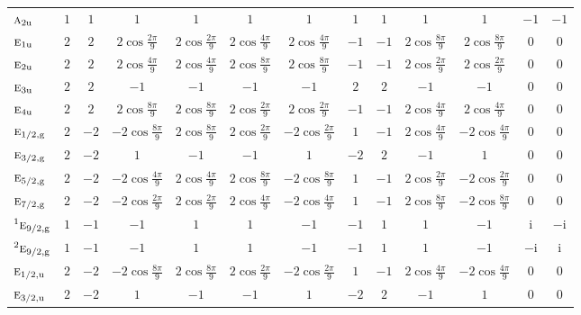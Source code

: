 \documentclass[10pt,a4paper]{article}
\makeatletter
\def\grouprule#1#2{\noalign{\marks\LTgroupmarks{\the\belowrulesep}\nobreak\vskip#1%
  \vskip\aboverulesep}\multispan\LT@cols\unskip{\leaders\hrule\@height#2\hfill\kern\z@}\cr
  \noalign{\penalty\LTrulebreak\vskip\belowrulesep\global\@lastruleclass\z@}}
\numberwithin{equation}{section}
\newcommand{\irr}[1]{\text{\normalfont\scshape #1}}
\newcommand{\conjpair}[1]{{}^{#1}}
\newcommand{\ptag}[1]{\mathrm{#1}}
\newcommand{\iunit}{\mathrm{i}}
\makeatother
\begin{document}
{{\begin{longtable}{@{}lcccccccccccc@{}}
$\irr{a}_{2\ptag{u}}$ & $1$ & $1$ & $1$ & $1$ & $1$ & $1$ & $1$ & $1$ & $1$ & $1$ & $-1$ & $-1$\\
$\irr{e}_{1\ptag{u}}$ & $2$ & $2$ & $2\cos\tfrac{2\pi}{9}$ & $2\cos\tfrac{2\pi}{9}$ & $2\cos\tfrac{4\pi}{9}$ & $2\cos\tfrac{4\pi}{9}$ & $-1$ & $-1$ & $2\cos\tfrac{8\pi}{9}$ & $2\cos\tfrac{8\pi}{9}$ & $0$ & $0$\\
$\irr{e}_{2\ptag{u}}$ & $2$ & $2$ & $2\cos\tfrac{4\pi}{9}$ & $2\cos\tfrac{4\pi}{9}$ & $2\cos\tfrac{8\pi}{9}$ & $2\cos\tfrac{8\pi}{9}$ & $-1$ & $-1$ & $2\cos\tfrac{2\pi}{9}$ & $2\cos\tfrac{2\pi}{9}$ & $0$ & $0$\\
$\irr{e}_{3\ptag{u}}$ & $2$ & $2$ & $-1$ & $-1$ & $-1$ & $-1$ & $2$ & $2$ & $-1$ & $-1$ & $0$ & $0$\\
$\irr{e}_{4\ptag{u}}$ & $2$ & $2$ & $2\cos\tfrac{8\pi}{9}$ & $2\cos\tfrac{8\pi}{9}$ & $2\cos\tfrac{2\pi}{9}$ & $2\cos\tfrac{2\pi}{9}$ & $-1$ & $-1$ & $2\cos\tfrac{4\pi}{9}$ & $2\cos\tfrac{4\pi}{9}$ & $0$ & $0$\\
\grouprule{0pt}{\lightrulewidth}
$\irr{e}_{1/2,\ptag{g}}$ & $2$ & $-2$ & $-2\cos\tfrac{8\pi}{9}$ & $2\cos\tfrac{8\pi}{9}$ & $2\cos\tfrac{2\pi}{9}$ & $-2\cos\tfrac{2\pi}{9}$ & $1$ & $-1$ & $2\cos\tfrac{4\pi}{9}$ & $-2\cos\tfrac{4\pi}{9}$ & $0$ & $0$\\
$\irr{e}_{3/2,\ptag{g}}$ & $2$ & $-2$ & $1$ & $-1$ & $-1$ & $1$ & $-2$ & $2$ & $-1$ & $1$ & $0$ & $0$\\
$\irr{e}_{5/2,\ptag{g}}$ & $2$ & $-2$ & $-2\cos\tfrac{4\pi}{9}$ & $2\cos\tfrac{4\pi}{9}$ & $2\cos\tfrac{8\pi}{9}$ & $-2\cos\tfrac{8\pi}{9}$ & $1$ & $-1$ & $2\cos\tfrac{2\pi}{9}$ & $-2\cos\tfrac{2\pi}{9}$ & $0$ & $0$\\
$\irr{e}_{7/2,\ptag{g}}$ & $2$ & $-2$ & $-2\cos\tfrac{2\pi}{9}$ & $2\cos\tfrac{2\pi}{9}$ & $2\cos\tfrac{4\pi}{9}$ & $-2\cos\tfrac{4\pi}{9}$ & $1$ & $-1$ & $2\cos\tfrac{8\pi}{9}$ & $-2\cos\tfrac{8\pi}{9}$ & $0$ & $0$\\
$\conjpair{1}\irr{e}_{9/2,\ptag{g}}$ & $1$ & $-1$ & $-1$ & $1$ & $1$ & $-1$ & $-1$ & $1$ & $1$ & $-1$ & $\iunit{}$ & $-\iunit{}$\\
$\conjpair{2}\irr{e}_{9/2,\ptag{g}}$ & $1$ & $-1$ & $-1$ & $1$ & $1$ & $-1$ & $-1$ & $1$ & $1$ & $-1$ & $-\iunit{}$ & $\iunit{}$\\
$\irr{e}_{1/2,\ptag{u}}$ & $2$ & $-2$ & $-2\cos\tfrac{8\pi}{9}$ & $2\cos\tfrac{8\pi}{9}$ & $2\cos\tfrac{2\pi}{9}$ & $-2\cos\tfrac{2\pi}{9}$ & $1$ & $-1$ & $2\cos\tfrac{4\pi}{9}$ & $-2\cos\tfrac{4\pi}{9}$ & $0$ & $0$\\
$\irr{e}_{3/2,\ptag{u}}$ & $2$ & $-2$ & $1$ & $-1$ & $-1$ & $1$ & $-2$ & $2$ & $-1$ & $1$ & $0$ & $0$\\

\end{longtable}}}
\end{document}
